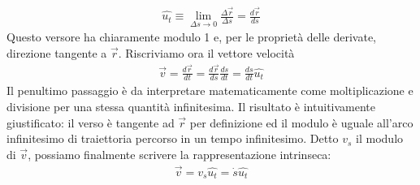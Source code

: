 \begin{align*}
	\hat{u_t} \equiv \lim_{\Delta s \to 0} \frac{\Delta \vec{r}}{\Delta s} = \frac{d\vec{r}}{ds}
\end{align*}
Questo versore ha chiaramente modulo 1 e, per le proprietà delle derivate, direzione tangente a $\vec{r}$. Riscriviamo ora il vettore velocità
\begin{align*}
	\vec{v} = \frac{d\vec{r}}{dt} = \frac{d\vec{r}}{ds} \frac{ds}{dt} = \frac{ds}{dt} \hat{u_t}
\end{align*}
Il penultimo passaggio è da interpretare matematicamente come moltiplicazione e divisione per una stessa quantità infinitesima. Il risultato è intuitivamente giustificato: il verso è tangente ad $\vec{r}$ per definizione ed il modulo è uguale all'arco infinitesimo di traiettoria percorso in un tempo infinitesimo. Detto $v_{s}$ il modulo di $\vec{v}$, possiamo finalmente scrivere la rappresentazione intrinseca: 
\begin{align*}
\vec{v} = v_s \hat{u_t} = \dot{s} \hat{u_t}
\end{align*}
